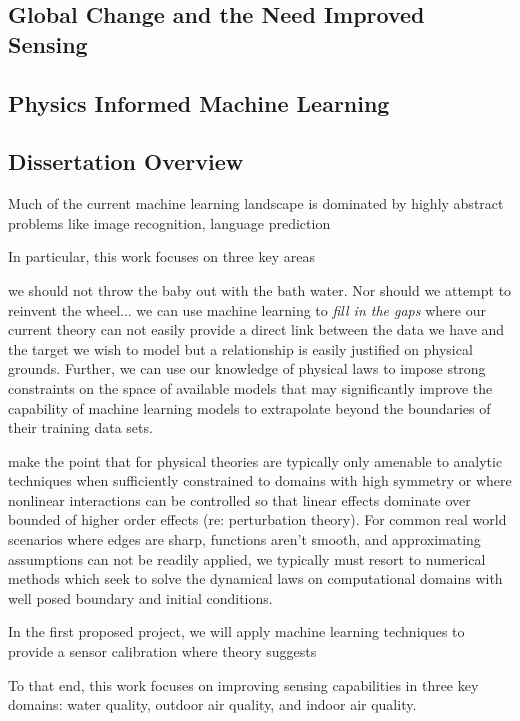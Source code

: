 \subsection{Global Change and the Need Improved Sensing}

\subsection{Physics Informed Machine Learning}

\subsection{Dissertation Overview}





Much of the current machine learning landscape is dominated by highly abstract problems like image recognition, language prediction

In particular, this work focuses on three key areas

we should not throw the baby out with the bath water. Nor should we attempt to reinvent the wheel... we can use machine learning to \textit{fill in the gaps} where our current theory can not easily provide a direct link between the data we have and the target we wish to model but a relationship is easily justified on physical grounds. Further, we can use our knowledge of physical laws to impose strong constraints on the space of available models that may significantly improve the capability of machine learning models to extrapolate beyond the boundaries of their training data sets. 

make the point that for physical theories are typically only amenable to analytic techniques when sufficiently constrained to domains with high symmetry or where nonlinear interactions can be controlled so that linear effects dominate over bounded of higher order effects (re: perturbation theory). For common real world scenarios where edges are sharp, functions aren't smooth, and approximating assumptions can not be readily applied, we typically must resort to numerical methods which seek to solve the dynamical laws on computational domains with well posed boundary and initial conditions.

In the first proposed project, we will apply machine learning techniques to provide a sensor calibration where theory suggests


To that end, this work focuses on improving sensing capabilities in three key domains: water quality, outdoor air quality, and indoor air quality.






